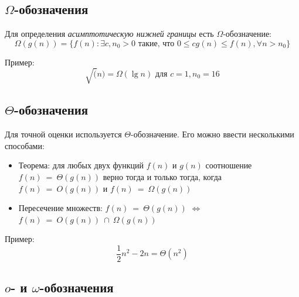 \documentclass[11pt]{article}
\begin{document}
\subsection{$\Omega$-обозначения}

Для определения \emph{асимптотическую нижней границы} есть $\Omega$-обозначение:
\begin{equation*}
  \Omega(g(n)) = \{f(n): \exists c, n_0 > 0 \text{ такие, что }
  0 \leqslant c g(n) \leqslant f(n), \forall n > n_0
  \}
\end{equation*}

Пример:
\begin{equation*}
  \sqrt(n) = \Omega(\lg n) \text{ для } c = 1, n_0 = 16
\end{equation*}

\subsection{$\Theta$-обозначения}

Для точной оценки используется $\Theta$-обозначение. Его можно ввести несколькими способами:
\begin{itemize}
\item Теорема: для любых двух функций $f(n)$ и $g(n)$ соотношение $f(n)~=~\Theta(g(n))$ верно тогда и только тогда, когда $f(n)~=~O(g(n))$ и $f(n)~=~\Omega(g(n))$
\item Пересечение множеств: $f(n)~=~\Theta(g(n))$ $\iff$ $f(n)~=~O(g(n))~\cap~\Omega(g(n))$
\end{itemize}

Пример:
\begin{equation*}
  \frac{1}{2}n^2 - 2n = \Theta(n^2)
\end{equation*}

\subsection{$o$- и $\omega$-обозначения}
\end{document}
